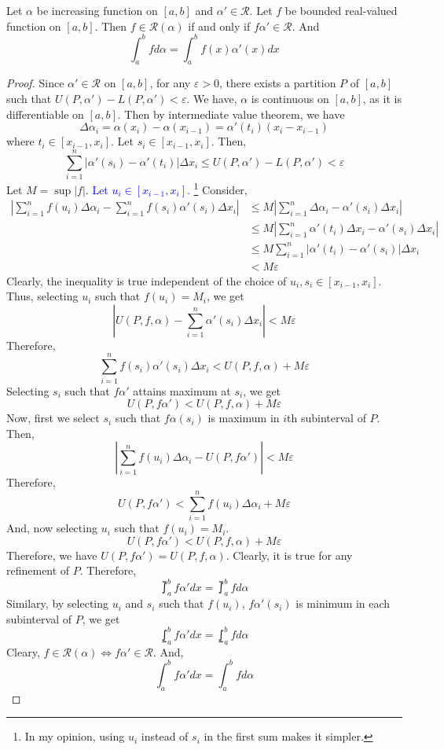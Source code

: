 \begin{theorem}
	Let $\alpha$ be increasing function on $[a,b]$ and $\alpha' \in \mathscr{R}$.
	Let $f$ be bounded real-valued function on $[a,b]$.
	Then $f \in \mathscr{R}(\alpha)$ if and only if $f\alpha' \in \mathscr{R}$.
	And
	\[ \int_a^b f d\alpha = \int_a^b f(x)\alpha'(x) dx \]
\end{theorem}
\begin{proof}
	Since $\alpha' \in \mathscr{R}$ on $[a,b]$, for any $\varepsilon > 0$, there exists a partition $P$ of $[a,b]$ such that $U(P,\alpha')-L(P,\alpha') < \varepsilon$.
	We have, $\alpha$ is continuous on $[a,b]$, as it is differentiable on $[a,b]$.
	Then by intermediate value theorem, we have
	\[ \Delta \alpha_i = \alpha(x_i) - \alpha(x_{i-1}) = \alpha'(t_i) (x_i-x_{i-1}) \]
	where $t_i \in [x_{i-1},x_i]$.
	Let $s_i \in [x_{i-1},x_i]$.
	Then,
	\[ \sum_{i=1}^n |\alpha'(s_i) - \alpha'(t_i)|\Delta x_i \le U(P,\alpha') - L(P,\alpha') < \varepsilon \]
	Let $M = \sup |f|$.
	\textcolor{blue}{Let $u_i \in [x_{i-1},x_i]$.}
	\footnote{In my opinion, using $u_i$ instead of $s_i$ in the first sum makes it simpler.}
	Consider,
	\begin{align*}
	\left| \sum_{i=1}^n f(u_i) \Delta \alpha_i - \sum_{i=1}^n f(s_i) \alpha'(s_i) \Delta x_i \right| 
		& \le M \left| \sum_{i=1}^n \Delta \alpha_i - \alpha'(s_i) \Delta x_i \right| \\
		& \le M \left| \sum_{i=1}^n \alpha'(t_i) \Delta x_i - \alpha'(s_i) \Delta x_i \right| \\
		& \le M  \sum_{i=1}^n |\alpha'(t_i) - \alpha'(s_i)| \Delta x_i \\
		& < M \varepsilon 
	\end{align*}
	Clearly, the inequality is true independent of the choice of $u_i,s_i \in [x_{i-1},x_i]$.
	Thus, selecting $u_i$ such that $f(u_i) = M_i$, we get
	\[ \left| U(P,f,\alpha) - \sum_{i=1}^n \alpha'(s_i)\Delta x_i \right| < M\varepsilon \]
	Therefore,
	\[ \sum_{i=1}^n f(s_i) \alpha'(s_i) \Delta x_i < U(P,f,\alpha) + M\varepsilon \]
	Selecting $s_i$ such that $f\alpha'$ attains maximum at $s_i$, we get
	\[ U(P,f\alpha') < U(P,f,\alpha) + M\varepsilon \]
	Now, first we select $s_i$ such that $f\alpha(s_i)$ is maximum in $i$th subinterval of $P$.
	Then,
	\[ \left| \sum_{i=1}^n f(u_i) \Delta \alpha_i - U(P,f\alpha') \right| < M\varepsilon \]
	Therefore,
	\[ U(P,f\alpha') < \sum_{i=1}^n f(u_i) \Delta \alpha_i + M\varepsilon \]
	And, now selecting $u_i$ such that $f(u_i) = M_i$.
	\[ U(P,f\alpha') < U(P,f,\alpha) + M\varepsilon \]
	Therefore, we have $U(P,f\alpha') = U(P,f,\alpha)$.
	Clearly, it is true for any refinement of $P$.
	Therefore,
	\[ \upint_a^b f\alpha' dx = \upint_a^b f d\alpha \]
	Similary, by selecting $u_i$ and $s_i$ such that $f(u_i)$, $f\alpha'(s_i)$ is minimum in each subinterval of $P$, we get
	\[ \lowint_a^b f\alpha' dx = \lowint_a^b f d\alpha \]
	Cleary, $f \in \mathscr{R}(\alpha) \iff f\alpha' \in \mathscr{R}$. And,
	\[ \int_a^b f\alpha' dx = \int_a^b f d\alpha \]
\end{proof}

